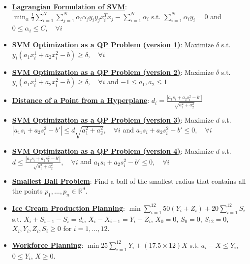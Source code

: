\documentclass{article}%
\begin{document}
\begin{itemize}[leftmargin=*]
\item \href{https://www.math.purdue.edu/~yipn/421/2024-10-22-Regression.pdf#page=11}{\textbf{Lagrangian Formulation of SVM}}: $\min_{\alpha} \frac{1}{2} \sum_{i=1}^N \sum_{j=1}^N \alpha_i \alpha_j y_i y_j x_i^T x_j - \sum_{i=1}^N \alpha_i$ s.t. $\sum_{i=1}^N \alpha_i y_i = 0$ and $0 \le \alpha_i \le C, \quad \forall i$%
\item \href{https://www.math.purdue.edu/~yipn/421/2024-10-22-Regression.pdf#page=13}{\textbf{SVM Optimization as a QP Problem (version 1)}}: Maximize $\delta$ s.t. $y_i (a_1 x_i^1 + a_2 x_i^2 - b) \ge \delta, \quad \forall i$%
\item \href{https://www.math.purdue.edu/~yipn/421/2024-10-22-Regression.pdf#page=14}{\textbf{SVM Optimization as a QP Problem (version 2)}}: Maximize $\delta$ s.t. $y_i (a_1 x_i^1 + a_2 x_i^2 - b) \ge \delta, \quad \forall i$ and $-1 \le a_1, a_2 \le 1$%
\item \href{https://www.math.purdue.edu/~yipn/421/2024-10-22-Regression.pdf#page=18}{\textbf{Distance of a Point from a Hyperplane}}: $d_i = \frac{|a_1 s_i + a_2 s_i^2 - b'|}{\sqrt{a_1^2 + a_2^2}}$%
\item \href{https://www.math.purdue.edu/~yipn/421/2024-10-22-Regression.pdf#page=19}{\textbf{SVM Optimization as a QP Problem (version 3)}}: Maximize $d$ s.t. $|a_1 s_i + a_2 s_i^2 - b'| \le d \sqrt{a_1^2 + a_2^2}, \quad \forall i$ and $a_1 s_i + a_2 s_i^2 - b' \le 0, \quad \forall i$%
\item \href{https://www.math.purdue.edu/~yipn/421/2024-10-22-Regression.pdf#page=20}{\textbf{SVM Optimization as a QP Problem (version 4)}}: Maximize $d$ s.t. $d \le \frac{|a_1 s_i + a_2 s_i^2 - b'|}{\sqrt{a_1^2 + a_2^2}}, \quad \forall i$ and $a_1 s_i + a_2 s_i^2 - b' \le 0, \quad \forall i$%
\item \href{https://www.math.purdue.edu/~yipn/421/2024-10-22-Regression.pdf#page=22}{\textbf{Smallest Ball Problem}}: Find a ball of the smallest radius that contains all the points $p_1, \dots, p_n \in \mathbb{R}^d$.%
\item \href{https://www.math.purdue.edu/~yipn/421/2024-10-28-ApplsLinProg.pdf#page=5}{\textbf{Ice Cream Production Planning}}: $\min \sum_{i=1}^{12} 50(Y_i + Z_i) + 20 \sum_{i=1}^{12} S_i$  s.t. $X_i + S_{i-1} - S_i = d_i$, $X_i - X_{i-1} = Y_i - Z_i$, $X_0 = 0$, $S_0 = 0$, $S_{12} = 0$, $X_i, Y_i, Z_i, S_i \ge 0$ for $i=1, \dots, 12$.%
\item \href{https://www.math.purdue.edu/~yipn/421/2024-10-28-ApplsLinProg.pdf#page=8}{\textbf{Workforce Planning}}: $\min 25 \sum_{i=1}^{12} Y_i + (17.5 \times 12) X$ s.t. $a_i - X \le Y_i$, $0 \le Y_i$, $X \ge 0$.%

\end{itemize}
\end{document}
